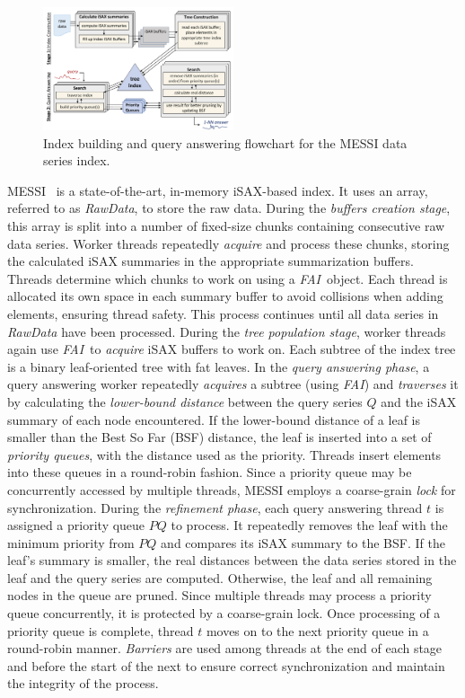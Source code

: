 \documentclass[a4paper,11pt,twoside,openany]{book}
\newcommand{\FAI}{\mbox{\textit{FAI}}}
\begin{document}
\begin{figure}[H]
    \centering
    \includegraphics[width=0.5\textwidth]{figures/prelem/flowchart2.pdf}
    \caption{Index building and query answering flowchart for the MESSI data series index.}
    \label{fig:example2}
    \vspace{-0.5cm} %
\end{figure}


MESSI~\cite{peng2020messi} is a state-of-the-art, in-memory iSAX-based index.
It uses an array, referred to as \textit{RawData}, to store the raw data. During the 
{\em buffers creation stage}, this array is split into a number of fixed-size chunks 
containing consecutive raw data series. Worker threads repeatedly {\em acquire} and
process these chunks, storing the calculated iSAX summaries in the appropriate 
summarization buffers. Threads determine which chunks to work on using a \FAI\ object.
Each thread is allocated its own space in each summary buffer to avoid collisions when
adding elements, ensuring thread safety. This process continues until all data series in
\textit{RawData} have been processed.
% 
During the {\em tree population stage}, worker threads again use \FAI\ to {\em acquire}
iSAX buffers to work on. Each subtree of the index tree is a binary leaf-oriented tree
with fat leaves.
% 
In the {\em query answering phase}, a query answering worker repeatedly {\em acquires}
a subtree (using \FAI) and {\em traverses} it by calculating the {\em lower-bound
distance} between the query series \( Q \) and the iSAX summary of each node
encountered. If the lower-bound distance of a leaf is smaller than the Best So Far (BSF)
distance, the leaf is inserted into a set of {\em priority queues}, with the distance
used as the priority. Threads insert elements into these queues in a round-robin fashion.
Since a priority queue may be concurrently accessed by multiple threads, 
MESSI employs a coarse-grain {\em lock} for synchronization.
% 
During the {\em refinement phase}, each query answering thread \( t \) is assigned a 
priority queue \( \mathit{PQ} \) to process. It repeatedly removes the leaf with the
minimum priority from \( \mathit{PQ} \) and compares its iSAX summary to the BSF.
If the leaf's summary is smaller, the real distances between the data series stored
in the leaf and the query series are computed. Otherwise, the leaf and all remaining
nodes in the queue are pruned. Since multiple threads may process a priority queue
concurrently, it is protected by a coarse-grain lock. Once processing of a priority
queue is complete, thread \( t \) moves on to the next priority queue in a round-robin
manner.
% 
{\em Barriers} are used among threads at the end of each stage and before the start of 
the next to ensure correct synchronization and maintain the integrity of the process.
\end{document}
